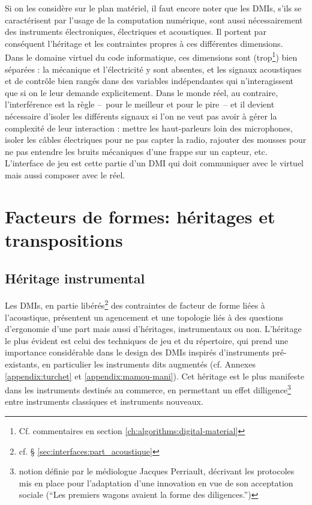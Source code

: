\noindent Si on les considère sur le plan matériel, il faut encore noter que les \glspl{DMI}, s'ils se caractérisent par l'usage de la computation numérique, sont aussi nécessairement des instruments électroniques, électriques et acoustiques. Il portent par conséquent l'héritage et les contraintes propres à ces différentes dimensions.\\
\indent Dans le domaine virtuel du code informatique, ces dimensions sont (trop\footnote{Cf. commentaires en section \ref{ch:algorithms:digital-material}}) bien séparées : la mécanique et l'électricité y sont absentes, et les signaux acoustiques et de contrôle bien rangés dans des variables indépendantes qui n'interagissent que si on le leur demande explicitement. Dans le monde réel, au contraire, l'interférence est la règle --~pour le meilleur et pour le pire~-- et il devient nécessaire d'isoler les différents signaux si l'on ne veut pas avoir à gérer la complexité de leur interaction : mettre les haut-parleurs loin des microphones, isoler les câbles électriques pour ne pas capter la radio, rajouter des mousses pour ne pas entendre les bruits mécaniques d'une frappe sur un capteur, etc. L'interface de jeu est cette partie d'un \gls{DMI} qui doit communiquer avec le virtuel mais aussi composer avec le réel.


\section{Facteurs de formes: héritages et transpositions}
\label{sec:interfaces:heritages}

\subsection{Héritage instrumental}

\noindent Les \glspl{DMI}, en partie libérés\footnote{cf. § \ref{sec:interfaces:part_acoustique}} des contraintes de facteur de forme liées à l'acoustique, présentent un agencement et une topologie liés à des questions d'ergonomie d'une part mais aussi d'héritages, instrumentaux ou non. L'héritage le plus évident est celui des techniques de jeu et du répertoire, qui prend une importance considérable dans le design des \glspl{DMI} inspirés d'instruments pré-existants, en particulier les instruments dits augmentés (cf. Annexes \ref{appendix:turchet} et \ref{appendix:mamou-mani}). Cet héritage est le plus manifeste dans les instruments destinés au commerce, en permettant un effet dilligence\footnote{notion définie par le médiologue Jacques Perriault, décrivant les protocoles mis en place pour l'adaptation d'une innovation en vue de son acceptation sociale (``Les premiers wagons avaient la forme des diligences.'')} entre instruments classiques et instruments nouveaux.\\

